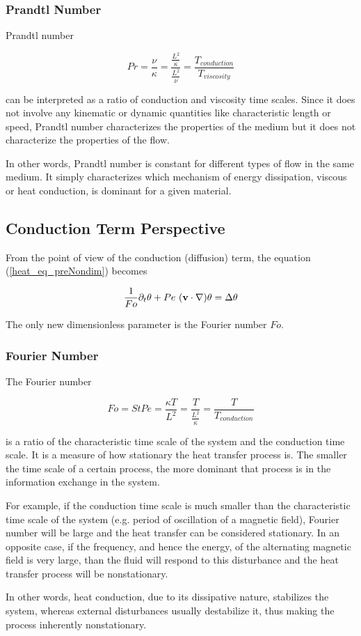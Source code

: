 \subsubsection{Prandtl Number}

Prandtl number

$$ Pr = \frac{\nu}{\kappa} = \frac{\frac{L^2}{\kappa}}{\frac{L^2}{\nu}} = \frac{T_{conduction}}{T_{viscosity}} $$

can be interpreted as a ratio of conduction and viscosity time scales. Since it does not involve any kinematic or dynamic quantities like characteristic length or speed, Prandtl number characterizes the properties of the medium but it does not characterize the properties of the flow. 

In other words, Prandtl number is constant for different types of flow in the same medium. It simply characterizes which mechanism of energy dissipation, viscous or heat conduction, is dominant for a given material.

\subsection{Conduction Term Perspective}

From the point of view of the conduction (diffusion) term, the equation (\ref{heat_eq_preNondim}) becomes

\begin{equation} \label{heat_eq_diffusNondim}
\frac{1}{Fo} \partial_t\theta + Pe ~(\mathbf{v} \cdot \nabla)\theta = \Delta\theta  
\end{equation}

The only new dimensionless parameter is the Fourier number $Fo$.

\subsubsection{Fourier Number}

The Fourier number

$$ Fo = St Pe = \frac{\kappa T}{L^2} = \frac{T}{\frac{L^2}{\kappa}} = \frac{T}{T_{conduction}}$$

is a ratio of the characteristic time scale of the system and the conduction time scale. It is a measure of how stationary the heat transfer process is. The smaller the time scale of a certain process, the more dominant that process is in the information exchange in the system. 

For example, if the conduction time scale is much smaller than the characteristic time scale of the system (e.g. period of oscillation of a magnetic field), Fourier number will be large and the heat transfer can be considered stationary. In an opposite case, if the frequency, and hence the energy, of the alternating magnetic field is very large, than the fluid will respond to this disturbance and the heat transfer process will be nonstationary.

In other words, heat conduction, due to its dissipative nature, stabilizes the system, whereas external disturbances usually destabilize it, thus making the process inherently nonstationary.
